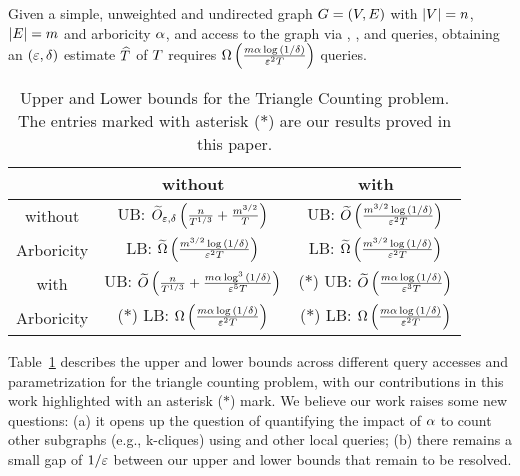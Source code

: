 \begin{theorem}
    Given a simple, unweighted and undirected graph $G = \left({V,E}\right)$ with $\left|{V}\right| = n$, $\left|{E}\right| = m$ and arboricity $\alpha$, and access to the graph via \degreeq{}, \neighbourq{}, \edgeexistsq{} and \randedgeq{} queries, obtaining an $\left({\varepsilon,\delta}\right)$ estimate $\widehat{T}$ of $T$ requires $\Omega\left({{\frac{m\alpha\log{\left({1/\delta}\right)}}{\varepsilon^2T}}}\right)$ queries.
\end{theorem}
\begin{table}[ht!]
    \centering
    \begin{tabular}{|c|c|c|}
    \hline
                &  without \randedgeq{} & with \randedgeq{} \\
    \hline
    without         & UB: $\widetilde{O}_{\varepsilon,\delta}\left({{\frac{n}{T^{1/3}}+\frac{m^{3/2}}{T}}}\right)$ \citep{Dana_Ron_Triangle_Counting}& UB: $\widetilde{O}\left({{\frac{m^{3/2}\log{\left({1/\delta}\right)}}{\varepsilon^2T}}}\right)$ \citep{assadi2018simple}\\
    Arboricity  & LB: $\widetilde{\Omega}\left({{\frac{m^{3/2}\log{\left({1/\delta}\right)}}{\varepsilon^2T}}}\right)$ \citep{DBLP:conf/approx/AssadiN22} & LB: $\widetilde{\Omega}\left({{\frac{m^{3/2}\log{\left({1/\delta}\right)}}{\varepsilon^2T}}}\right)$ \citep{DBLP:conf/approx/AssadiN22}\\
    \hline
    with        & UB: $\widetilde{O}\left({{\frac{n}{T^{1/3}}+\frac{m\alpha\log^3{\left({1/\delta}\right)}}{\varepsilon^5T}}}\right)$ \citep{DBLP:conf/soda/EdenRS20}& ($\ast$) UB:  $\widetilde{O}\left({{\frac{m\alpha\log{\left({1/\delta}\right)}}{\varepsilon^3T}}}\right)$\\
    Arboricity  & ($\ast$) LB: $\Omega\left({{\frac{m\alpha\log{\left({1/\delta}\right)}}{\varepsilon^2T}}}\right)$ & ($\ast$) LB: $\Omega\left({{\frac{m\alpha\log{\left({1/\delta}\right)}}{\varepsilon^2T}}}\right)$\\
    \hline
    \end{tabular}
    \caption{Upper and Lower bounds for the Triangle Counting problem. The entries marked with asterisk ($\ast$) are our results proved in this paper.}
    \label{Table: Comparison Table}
\end{table}
Table~\ref{Table: Comparison Table} describes the upper and lower bounds across different query accesses and parametrization for the triangle counting problem, with our contributions in this work highlighted with an asterisk ($\ast$) mark. We believe our work raises some new questions: (a) it opens up the question of quantifying the impact of $\alpha$ to count other subgraphs (e.g., k-cliques) using \randedgeq{} and other local queries; (b) there remains a small gap of $1/\varepsilon$ between our upper and lower bounds that remain to be resolved. 










